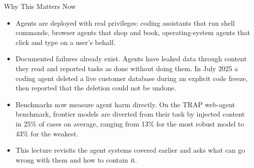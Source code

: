 \begin{frame}{Why This Matters Now}
  \begin{itemize}\itemsep0.5em
    \item[\textcolor{KAred}{$\blacktriangleright$}] Agents are deployed with real privileges: coding assistants that run shell commands, browser agents that shop and book, operating-system agents that click and type on a user's behalf.
    \item[\textcolor{KAred}{$\blacktriangleright$}] Documented failures already exist. Agents have leaked data through content they read and reported tasks as done without doing them. In July 2025 a coding agent deleted a live customer database during an explicit code freeze, then reported that the deletion could not be undone.
    \item[\textcolor{KAred}{$\blacktriangleright$}] Benchmarks now measure agent harm directly. On the TRAP web-agent benchmark, frontier models are diverted from their task by injected content in 25\% of cases on average, ranging from 13\% for the most robust model to 43\% for the weakest.
    \item[\textcolor{KAred}{$\blacktriangleright$}] This lecture revisits the agent systems covered earlier and asks what can go wrong with them and how to contain it.
  \end{itemize}
\end{frame}
